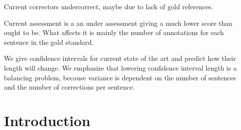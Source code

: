 \documentclass[english]{article}
\begin{document}
Current correctors undercorrect, maybe due to lack of gold references.

Current assessment is a an under assessment giving a much lower score
than ought to be. What affects it is mainly the number of annotations for each sentence in the gold standard.

We give confidence intervals for current state of the art and predict how their length will change. 
We emphasize that lowering confidence interval length is a balancing problem, 
because variance is dependent on the number of sentences and the number of corrections per sentence.


\section{Introduction}




\end{document}
